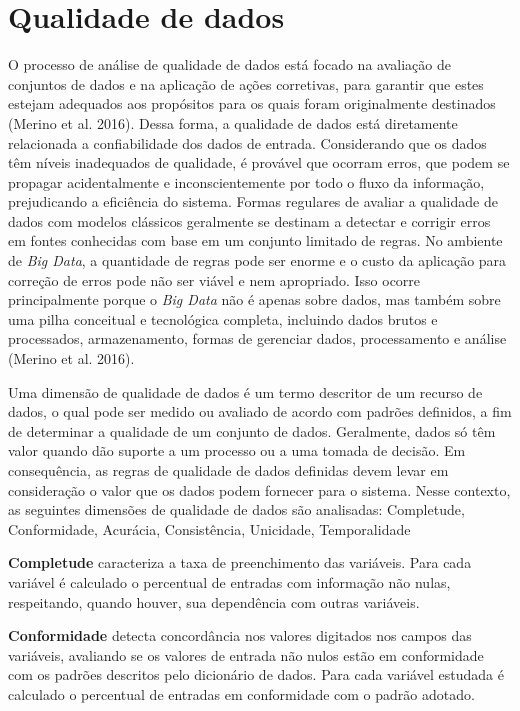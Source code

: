 \documentclass[
  12,
  table]{proadi}
\author{}
\date{\vspace{-2.5em}}
\begin{document}
\hypertarget{qualidade-de-dados}{%
\section{Qualidade de dados}\label{qualidade-de-dados}}

O processo de análise de qualidade de dados está focado na avaliação de
conjuntos de dados e na aplicação de ações corretivas, para garantir que
estes estejam adequados aos propósitos para os quais foram originalmente
destinados (Merino et al. 2016). Dessa forma, a qualidade de dados está
diretamente relacionada a confiabilidade dos dados de entrada.
Considerando que os dados têm níveis inadequados de qualidade, é
provável que ocorram erros, que podem se propagar acidentalmente e
inconscientemente por todo o fluxo da informação, prejudicando a
eficiência do sistema. Formas regulares de avaliar a qualidade de dados
com modelos clássicos geralmente se destinam a detectar e corrigir erros
em fontes conhecidas com base em um conjunto limitado de regras. No
ambiente de \emph{Big Data}, a quantidade de regras pode ser enorme e o
custo da aplicação para correção de erros pode não ser viável e nem
apropriado. Isso ocorre principalmente porque o \emph{Big Data} não é
apenas sobre dados, mas também sobre uma pilha conceitual e tecnológica
completa, incluindo dados brutos e processados, armazenamento, formas de
gerenciar dados, processamento e análise (Merino et al. 2016).

Uma dimensão de qualidade de dados é um termo descritor de um recurso de
dados, o qual pode ser medido ou avaliado de acordo com padrões
definidos, a fim de determinar a qualidade de um conjunto de dados.
Geralmente, dados só têm valor quando dão suporte a um processo ou a uma
tomada de decisão. Em consequência, as regras de qualidade de dados
definidas devem levar em consideração o valor que os dados podem
fornecer para o sistema. Nesse contexto, as seguintes dimensões de
qualidade de dados são analisadas: Completude, Conformidade, Acurácia,
Consistência, Unicidade, Temporalidade

\textbf{Completude} caracteriza a taxa de preenchimento das variáveis.
Para cada variável é calculado o percentual de entradas com informação
não nulas, respeitando, quando houver, sua dependência com outras
variáveis.

\textbf{Conformidade} detecta concordância nos valores digitados nos
campos das variáveis, avaliando se os valores de entrada não nulos estão
em conformidade com os padrões descritos pelo dicionário de dados. Para
cada variável estudada é calculado o percentual de entradas em
conformidade com o padrão adotado.
\end{document}

